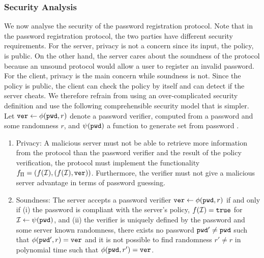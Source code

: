 \subsubsection{Security Analysis} \label{sec:bpr:security}
We now analyse the security of the password registration protocol. Note that in the password registration protocol, the two parties have different security requirements. For the server, privacy is not a concern since its input, the policy, is public. On the other hand, the server cares about the soundness of the protocol because an unsound protocol would allow a user to register an invalid password. For the client, privacy is the main concern while soundness is not. Since the policy is public, the client can check the policy by itself and can detect if the server cheats. 
We therefore refrain from using an over-complicated security definition and use the following comprehensible security model that is simpler. Let $\mathtt{ver}\gets\phi(\mathtt{pwd},r)$ denote a password verifier, computed from a password \pwd and some randomness $r$, and $\psi(\mathtt{pwd})$ a function to generate set \ClientSet from password \pwd.
\begin{enumerate}
  \item Privacy: A malicious server must not be able to retrieve more information from the protocol than the password verifier and the result of the policy verification, \ie the protocol must implement the functionality $f_{\Pi}=(f(\mathcal{I}), (f(\mathcal{I}), \mathtt{ver}))$. Furthermore, the verifier must not give a malicious server advantage in terms of password guessing. 
  \item Soundness: The server accepts a password verifier $\mathtt{ver}\gets\phi(\mathtt{pwd},r)$ if and only if (i) the password is compliant with the server's policy, \ie $f(\mathcal{I})=\mathtt{true}$ for $\mathcal{I}\gets\psi(\mathtt{pwd})$, and (ii) the verifier is uniquely defined by the password and some server known randomness, \ie there exists no password $\mathtt{pwd}'\not=\mathtt{pwd}$ such that $\phi(\mathtt{pwd}',r)=\mathtt{ver}$ and it is not possible to find randomness $r'\not=r$ in polynomial time such that $\phi(\mathtt{pwd},r')=\mathtt{ver}$.
\end{enumerate}


